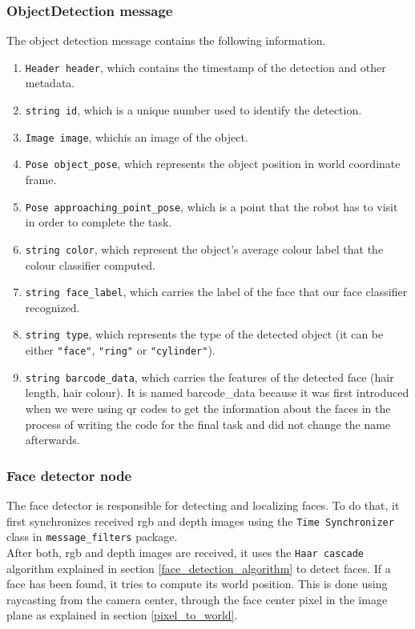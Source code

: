 \documentclass[12pt,a4paper]{article}
\begin{document}
	\subsubsection{ObjectDetection message} \label{objectDetection}
	The object detection message contains the following information.
	\begin{enumerate}
		\item \texttt{Header header}, which contains the timestamp of the detection and other metadata.
		\item \texttt{string id}, which is a unique number used to identify the detection.
		\item \texttt{Image image}, whichis an image of the object.
		\item \texttt{Pose object\_pose}, which represents the object position in world coordinate frame.
		\item \texttt{Pose approaching\_point\_pose}, which is a point that the robot has to visit in order to complete the task.
		\item \texttt{string color}, which represent the object's average colour label that the colour classifier computed.
		\item \texttt{string face\_label}, which carries the label of the face that our face classifier recognized.
		\item \texttt{string type}, which represents the type of the detected object (it can be either \texttt{"face"}, \texttt{"ring"} or \texttt{"cylinder"}).
		\item \texttt{string barcode\_data}, which carries the features of the detected face (hair length, hair colour). It is named barcode\_data because it was first introduced when we were using qr codes to get the information about the faces in the process of writing the code for the final task and did not change the name afterwards.
	\end{enumerate}
	
	\subsubsection{Face detector node}
	The face detector is responsible for detecting and localizing faces. To do that, it first synchronizes received rgb and depth images using the \texttt{Time Synchronizer} class in \texttt{message\_filters} package. \\

	After both, rgb and depth images are received, it uses the \texttt{Haar cascade} algorithm explained in section \ref{face_detection_algorithm} to detect faces. If a face has been found, it tries to compute its world position. This is done using raycasting from the camera center, through the face center pixel in the image plane as explained in section \ref{pixel_to_world}. \\
\end{document}
